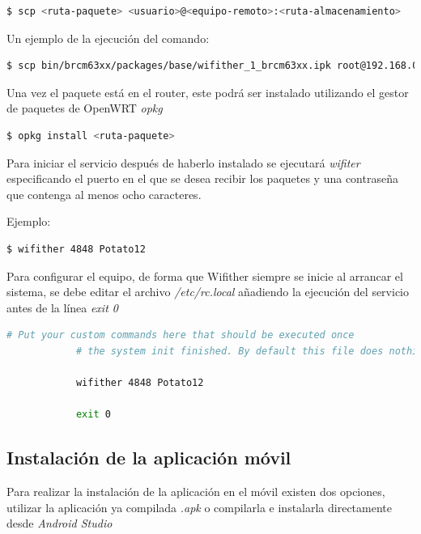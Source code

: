 \documentclass{article}
\begin{document}
        \begin{lstlisting}[language=bash]
            $ scp <ruta-paquete> <usuario>@<equipo-remoto>:<ruta-almacenamiento>
        \end{lstlisting}

        Un ejemplo de la ejecución del comando:
        \begin{lstlisting}[language=bash]
            $ scp bin/brcm63xx/packages/base/wifither_1_brcm63xx.ipk root@192.168.0.4:/root/wifither
        \end{lstlisting}

        Una vez el paquete está en el router, este podrá ser instalado utilizando el gestor de paquetes de OpenWRT \textit{opkg}
        \begin{lstlisting}[language=bash]
            $ opkg install <ruta-paquete>
        \end{lstlisting}

        Para iniciar el servicio después de haberlo instalado se ejecutará \textit{wifiter} especificando el puerto en el que se desea recibir los paquetes y una contraseña que contenga al menos ocho caracteres.

        Ejemplo:
        \begin{lstlisting}[language=bash]
            $ wifither 4848 Potato12
        \end{lstlisting}

        Para configurar el equipo, de forma que Wifither siempre se inicie al arrancar el sistema, se debe editar el archivo \textit{/etc/rc.local} añadiendo la ejecución del servicio antes de la línea \textit{exit 0}

        \begin{lstlisting}[language=bash]
            # Put your custom commands here that should be executed once
            # the system init finished. By default this file does nothing.

            wifither 4848 Potato12

            exit 0
        \end{lstlisting}


    \subsection{Instalación de la aplicación móvil}
        Para realizar la instalación de la aplicación en el móvil existen dos opciones, utilizar la aplicación ya compilada \textit{.apk} o compilarla e instalarla directamente desde \textit{Android Studio}
\end{document}
